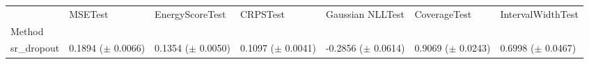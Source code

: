 \begin{tabular}{lllllll}
\toprule
 & MSETest & EnergyScoreTest & CRPSTest & Gaussian NLLTest & CoverageTest & IntervalWidthTest \\
Method &  &  &  &  &  &  \\
\midrule
sr_dropout & \makecell{0.1894 \\ ($\pm$ 0.0066)} & \makecell{0.1354 \\ ($\pm$ 0.0050)} & \makecell{0.1097 \\ ($\pm$ 0.0041)} & \makecell{-0.2856 \\ ($\pm$ 0.0614)} & \makecell{0.9069 \\ ($\pm$ 0.0243)} & \makecell{0.6998 \\ ($\pm$ 0.0467)} \\
\bottomrule
\end{tabular}
